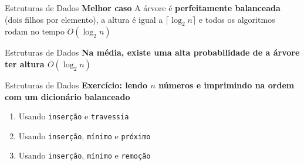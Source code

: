 \documentclass[10pt]{beamer}
\begin{document}
\begin{frame}{Estruturas de Dados}
  \huge
  \textbf{Melhor caso}
  \vfill
  A árvore é \textbf{perfeitamente balanceada} (dois filhos por elemento), a altura é igual a \textbf{$\lceil \log_2 n \rceil$} e todos os algoritmos rodam no tempo \textbf{$O(\log_2 n)$}
\end{frame}

\begin{frame}{Estruturas de Dados}
  \huge
  \textbf{Na \alert{média}, existe uma \alert{alta probabilidade} de a árvore ter altura \textbf{$O(\log_2 n)$}}
\end{frame}

\begin{frame}{Estruturas de Dados}
  \huge
  \textbf{Exercício: lendo $n$ números e imprimindo na ordem com um dicionário balanceado}
  \vfill
  \large
  \begin{enumerate}
    \item Usando \texttt{inserção} e \texttt{travessia}
    \item Usando \texttt{inserção}, \texttt{mínimo} e \texttt{próximo}
    \item Usando \texttt{inserção}, \texttt{mínimo} e \texttt{remoção}
  \end{enumerate}
\end{frame}
\end{document}
